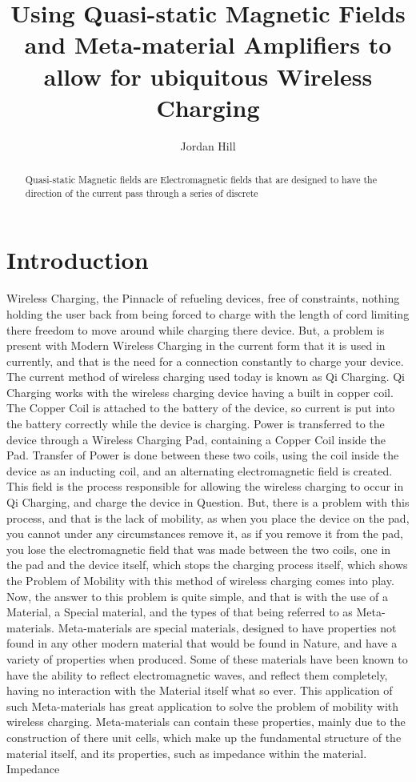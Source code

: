 \documentclass[]{article}
\title{Using Quasi-static Magnetic Fields and Meta-material Amplifiers to allow for ubiquitous Wireless Charging}
\author{Jordan Hill}
\begin{document}
\maketitle

\begin{abstract}
Quasi-static Magnetic fields are Electromagnetic fields that are designed to have the direction of the current pass through a series of discrete 
\end{abstract}

\section{Introduction}
Wireless Charging, the Pinnacle of refueling devices, free of constraints, nothing holding the user back from being forced to charge with the length of cord limiting there freedom to move around while charging there device. But, a problem is present with Modern Wireless Charging in the current form that it is used in currently, and that is the need for a connection constantly to charge your device. The current method of wireless charging used today is known as Qi Charging. Qi Charging works with the wireless charging device having a built in copper coil. The Copper Coil is attached to the battery of the device, so current is put into the battery correctly while the device is charging. Power is transferred to the device through a Wireless Charging Pad, containing a Copper Coil inside the Pad. Transfer of Power is done between these two coils, using the coil inside the device as an inducting coil, and an alternating electromagnetic field is created. This field is the process responsible for allowing the wireless charging to occur in Qi Charging, and charge the device in Question. But, there is a problem with this process, and that is the lack of mobility, as when you place the device on the pad, you cannot under any circumstances remove it, as if you remove it from the pad, you lose the electromagnetic field that was made between the two coils, one in the pad and the device itself, which stops the charging process itself, which shows the Problem of Mobility with this method of wireless charging comes into play. Now, the answer to this problem is quite simple, and that is with the use of a Material, a Special material, and the types of that being referred to as Meta-materials. Meta-materials are special materials, designed to have properties not found in any other modern material that would be found in Nature, and have a variety of properties when produced. Some of these materials have been known to have the ability to reflect electromagnetic waves, and reflect them completely, having no interaction with the Material itself what so ever. This application of such Meta-materials has great application to solve the problem of mobility with wireless charging. Meta-materials can contain these properties, mainly due to the construction of there unit cells, which make up the fundamental structure of the material itself, and its properties, such as impedance within the material. Impedance  
\end{document}
